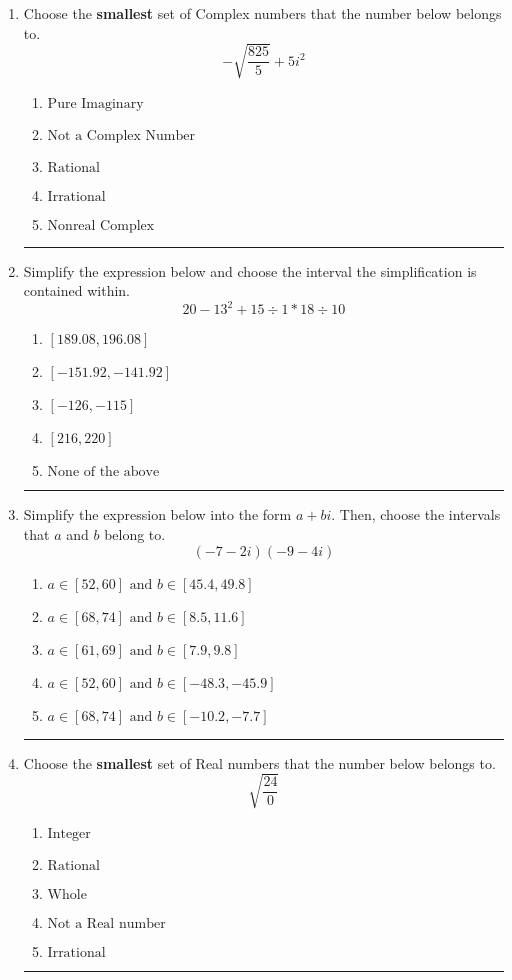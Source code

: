 \documentclass[14pt]{extbook}
\newcommand{\litem}[1]{\item#1\hspace*{-1cm}\rule{\textwidth}{0.4pt}}
\begin{document}
\begin{enumerate}
{\begin{enumerate}[label=\Alph*.]
\end{enumerate} }
\litem{
Choose the \textbf{smallest} set of Complex numbers that the number below belongs to.\[ -\sqrt{\frac{825}{5}}+5i^2 \]\begin{enumerate}[label=\Alph*.]
\item \( \text{Pure Imaginary} \)
\item \( \text{Not a Complex Number} \)
\item \( \text{Rational} \)
\item \( \text{Irrational} \)
\item \( \text{Nonreal Complex} \)

\end{enumerate} }
\litem{
Simplify the expression below and choose the interval the simplification is contained within.\[ 20 - 13^2 + 15 \div 1 * 18 \div 10 \]\begin{enumerate}[label=\Alph*.]
\item \( [189.08, 196.08] \)
\item \( [-151.92, -141.92] \)
\item \( [-126, -115] \)
\item \( [216, 220] \)
\item \( \text{None of the above} \)

\end{enumerate} }
\litem{
Simplify the expression below into the form $a+bi$. Then, choose the intervals that $a$ and $b$ belong to.\[ (-7 - 2 i)(-9 - 4 i) \]\begin{enumerate}[label=\Alph*.]
\item \( a \in [52, 60] \text{ and } b \in [45.4, 49.8] \)
\item \( a \in [68, 74] \text{ and } b \in [8.5, 11.6] \)
\item \( a \in [61, 69] \text{ and } b \in [7.9, 9.8] \)
\item \( a \in [52, 60] \text{ and } b \in [-48.3, -45.9] \)
\item \( a \in [68, 74] \text{ and } b \in [-10.2, -7.7] \)

\end{enumerate} }
\litem{
Choose the \textbf{smallest} set of Real numbers that the number below belongs to.\[ \sqrt{\frac{24}{0}} \]\begin{enumerate}[label=\Alph*.]
\item \( \text{Integer} \)
\item \( \text{Rational} \)
\item \( \text{Whole} \)
\item \( \text{Not a Real number} \)
\item \( \text{Irrational} \)


\end{enumerate}}
\end{enumerate}
\end{document}
